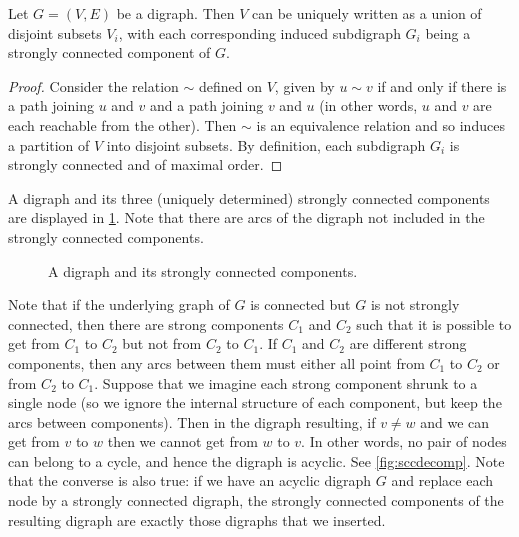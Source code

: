 \begin{Theorem}
\label{thm:scc}
Let $G=(V, E)$ be a digraph. Then $V$ can be uniquely written as a union of
disjoint subsets $V_i$, with each corresponding induced subdigraph $G_i$ being
a strongly connected component of $G$.
\end{Theorem}

\begin{proof} Consider the relation $\sim$ defined on $V$, given by
$u\sim v$ if and only if there is a path joining $u$ and $v$ and a path
joining $v$ and $u$ (in other words, $u$ and $v$ are each reachable
from the other). Then $\sim$ is an equivalence relation and so induces
a partition of $V$ into disjoint subsets.  By definition, each 
subdigraph $G_i$ is strongly connected and of maximal order.
\end{proof}

\begin{Example}\label{eg:scc}
A digraph and its three (uniquely determined) strongly connected
components are displayed in \cref{fig:scc}. Note that there are
arcs of the digraph not included in the strongly connected components.
\end{Example}

\begin{figure}[htbp]
\centerline{}

\caption{A digraph and its strongly connected components.}
\label{fig:scc}
\end{figure}

Note that if the underlying graph of $G$ is connected but $G$ is
not strongly connected, then  there are strong components $C_1$ and
$C_2$ such that it is possible to get from $C_1$ to $C_2$ but not
from $C_2$ to $C_1$. If $C_1$ and $C_2$ are different strong
components, then any arcs between them must either all point from
$C_1$ to $C_2$ or from $C_2$ to $C_1$.  Suppose that we imagine
each strong component shrunk to a single node (so we ignore the
internal structure of each component, but keep the arcs between
components). Then in the digraph resulting, if $v\neq w$ and we can
get from $v$ to $w$ then we cannot get from $w$ to $v$. In other
words, no pair of nodes can belong to a cycle, and hence the digraph
is acyclic. See \cref{fig:sccdecomp}. Note that the converse
is also true: if we have an acyclic digraph $G$ and replace each
node by a strongly connected digraph, the strongly connected
components of the resulting digraph are exactly those digraphs that
we inserted.

